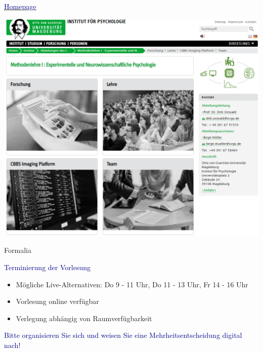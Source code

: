 \documentclass[
  8pt,
  ignorenonframetext,
]{beamer}
\providecommand{\tightlist}{%
  \setlength{\itemsep}{0pt}\setlength{\parskip}{0pt}}
\begin{document}
\begin{frame}{}
\protect\hypertarget{section-3}{}
\large

\href{https://www.ipsy.ovgu.de/methodenlehre_I-path-980,1404.html}{\textcolor{darkblue}{Homepage}}
\vspace{2mm}

\begin{center}\includegraphics[width=0.7\linewidth]{0_Abbildungen/pfm_0_homepage} \end{center}
\end{frame}

\begin{frame}{Formalia}
\protect\hypertarget{formalia-1}{}
\large
{}

\textcolor{darkblue}{Terminierung der Vorlesung}

\normalsize

\begin{itemize}
\tightlist
\item
  Mögliche Live-Alternativen: Do 9 - 11 Uhr, Do 11 - 13 Uhr, Fr 14 - 16
  Uhr
\item
  Vorlesung online verfügbar
\item
  Verlegung abhängig von Raumverfügbarkeit
\end{itemize}

\textcolor{darkblue}{Bitte organisieren Sie sich und weisen Sie eine Mehrheitsentscheidung digital nach!}
\end{frame}
\end{document}

